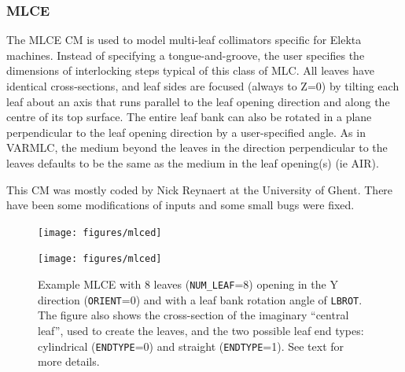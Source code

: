 \documentclass[12pt,twoside]{article}
\begin{document}
\subsubsection{MLCE}
\label{mlce}
\renewcommand{\rightmark}{MLCE CM}
The MLCE CM is used to model multi-leaf collimators specific for
Elekta machines.  Instead of
specifying a tongue-and-groove, the user specifies the dimensions of
interlocking steps typical of this class of MLC.  All leaves
have identical cross-sections, and leaf sides
are focused (always to Z=0) by tilting each leaf about an
axis that runs parallel to the leaf opening direction
and along the centre of its top surface.  The entire leaf bank can also
be rotated in a plane
perpendicular to the leaf opening direction by a user-specified angle.
As in
VARMLC, the medium beyond the leaves in the direction perpendicular
to the leaves defaults to be the same as the medium in the leaf opening(s)
(ie AIR).

This CM was mostly coded by Nick Reynaert at the University of Ghent.
There have been some modifications of inputs and some small bugs were
fixed.

\begin{figure}[htpb]
\begin{center}
\leavevmode
\begin{latexonly}
\texttt{[image: figures/mlced]}
\end{latexonly}
\begin{htmlonly}
\texttt{[image: figures/mlced]}
\end{htmlonly}
\end{center}
\caption[MLCE CM geometry]
{Example MLCE with 8 leaves ({\tt NUM\_LEAF}=8) opening in the Y
direction ({\tt ORIENT}=0) and with a leaf bank rotation angle
of {\tt LBROT}.  The figure also shows the cross-section
of the imaginary ``central leaf'', used to create the leaves, and
the two possible leaf end types: cylindrical ({\tt ENDTYPE}=0) and
straight ({\tt ENDTYPE}=1).  See text for more details.}
\label{mlce_fig}
\end{figure}
\end{document}
